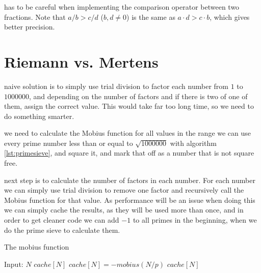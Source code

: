 \documentclass[11pt,a4paper,twoside]{article}
\begin{document}
 has to be careful when implementing the comparison operator
between two fractions.  Note that $a/b > c/d$ ($b,d \neq 0$) is the same as $a
\cdot d > c \cdot b$, which gives better precision.



\section{Riemann vs. Mertens}

 naive solution is to simply use trial division to factor each
number from $1$ to $1000000$, and depending on the number of factors and if
there is two of one of them, assign the correct value. This would take far too
long time, so we need to do something smarter.

 we need to calculate the Mobius function for all values in the
range we can use every prime number less than or equal to $\sqrt{1000000}$ with
algorithm \ref{lst:primesieve}, and square it, and mark that off as a number
that is not square free.

 next step is to calculate the number of factors in each number.
For each number we can simply use trial division to remove one factor and
recursively call the Mobius function for that value. As performance will be an
issue when doing this we can simply cache the results, as they will be used
more than once, and in order to get cleaner code we can add $-1$ to all primes
in the beginning, when we do the prime sieve to calculate them.

\begin{algorithm}
    \label{mobius}
    \caption{The mobius function}
    \begin{algorithmic}
        \REQUIRE Input: $N$
            \RETURN $cache[N]$
        \ENDIF
                \STATE $cache[N] = - mobius(N/p)$
                \RETURN $cache[N]$
            \ENDIF
        \ENDFOR
    \end{algorithmic}
\end{algorithm}
\end{document}
